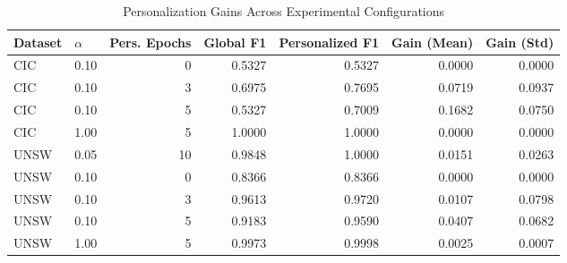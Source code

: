 \begin{table}[htbp]
\centering
\caption{Personalization Gains Across Experimental Configurations}
\label{tab:personalization-gains}
\begin{tabular}{llrrrrr}
\hline
Dataset & $\alpha$ & Pers. Epochs & Global F1 & Personalized F1 & Gain (Mean) & Gain (Std) \\
\hline
CIC & 0.10 & 0 & 0.5327 & 0.5327 & 0.0000 & 0.0000 \\
CIC & 0.10 & 3 & 0.6975 & 0.7695 & 0.0719 & 0.0937 \\
CIC & 0.10 & 5 & 0.5327 & 0.7009 & 0.1682 & 0.0750 \\
CIC & 1.00 & 5 & 1.0000 & 1.0000 & 0.0000 & 0.0000 \\
UNSW & 0.05 & 10 & 0.9848 & 1.0000 & 0.0151 & 0.0263 \\
UNSW & 0.10 & 0 & 0.8366 & 0.8366 & 0.0000 & 0.0000 \\
UNSW & 0.10 & 3 & 0.9613 & 0.9720 & 0.0107 & 0.0798 \\
UNSW & 0.10 & 5 & 0.9183 & 0.9590 & 0.0407 & 0.0682 \\
UNSW & 1.00 & 5 & 0.9973 & 0.9998 & 0.0025 & 0.0007 \\
\hline
\end{tabular}
\end{table}